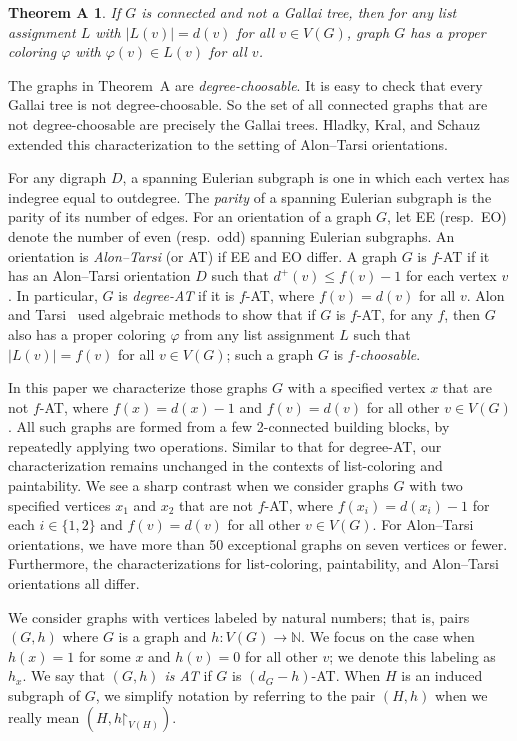 \documentclass[12pt]{article}
\theoremstyle{plain}
\newtheorem*{thmA}{Theorem A}
\theoremstyle{definition}
\theoremstyle{remark}
\newcommand{\IN}{\mathbb{N}}
\newcommand{\func}[3]{#1\colon #2 \rightarrow #3}
\newcommand{\parens}[1]{\left( #1 \right)}
\renewcommand{\restriction}{\mathord{\upharpoonright}}
\begin{document}
\begin{thmA}
If $G$ is connected and not a Gallai tree, then for any list assignment $L$
with $|L(v)|=d(v)$ for all $v\in V(G)$, graph $G$ has a proper coloring
$\varphi$ with $\varphi(v)\in L(v)$ for all $v$.  
\end{thmA}

The graphs in Theorem~A are \emph{degree-choosable}.  It is easy to check
that every Gallai tree is not degree-choosable.  So the set of all
connected graphs that are not degree-choosable are precisely the Gallai trees.
Hladky, Kral, and Schauz~\cite{HKS} extended this characterization to the setting of
Alon--Tarsi orientations.

For any digraph $D$, a spanning Eulerian subgraph is one in which each vertex
has indegree equal to outdegree.  The \emph{parity} of a spanning Eulerian
subgraph is the parity of its number of edges.  For an orientation of a graph
$G$, let EE (resp.~EO) denote the number of even (resp.~odd) spanning Eulerian
subgraphs.  An orientation is \emph{Alon--Tarsi} (or AT) if EE and
EO differ.  A graph $G$ is $f$-AT if it has an Alon--Tarsi
orientation $D$ such that $d^+(v)\le f(v)-1$ for each vertex $v$.  In
particular, $G$ is \emph{degree-AT} if it is $f$-AT, where $f(v)=d(v)$ for all
$v$.  Alon and Tarsi~\cite{AlonT} used algebraic methods to show that if $G$ is
$f$-AT, for any $f$, then $G$ also has a proper coloring $\varphi$ from any
list assignment $L$ such that $|L(v)|=f(v)$ for all $v\in V(G)$; such a graph
$G$ is \emph{$f$-choosable}.

In this paper we characterize those graphs $G$ with a specified vertex $x$
that are not $f$-AT, where $f(x)=d(x)-1$ and $f(v)=d(v)$ for all other $v\in
V(G)$.  All such graphs are formed from a few 2-connected building blocks, by
repeatedly applying two operations.  Similar to that for degree-AT, our
characterization remains unchanged in the contexts of list-coloring and
paintability.  We see a sharp contrast when we consider graphs $G$ with two
specified vertices $x_1$ and $x_2$ that are not $f$-AT, where
$f(x_i)=d(x_i)-1$ for each $i\in \{1,2\}$ and $f(v)=d(v)$ for all other
$v\in V(G)$.  For Alon--Tarsi orientations, we have more than 50 exceptional
graphs on seven vertices or fewer.  Furthermore, the characterizations for
list-coloring, paintability, and Alon--Tarsi orientations all differ.

\bigskip

We consider graphs with vertices labeled by natural numbers; that is, pairs
$(G,h)$ where $G$ is a graph and $\func{h}{V(G)}{\IN}$.  We focus on the case
when $h(x)=1$ for some $x$ and $h(v)=0$ for all other $v$; we denote this
labeling as $h_x$.  We say that \emph{$(G, h)$ is AT} if $G$ is $(d_G - h)$-AT.
 When $H$ is an induced subgraph of $G$, we simplify notation by referring to
the pair $(H, h)$ when we really mean $\parens{H, h\restriction_{V(H)}}$.
\end{document}
